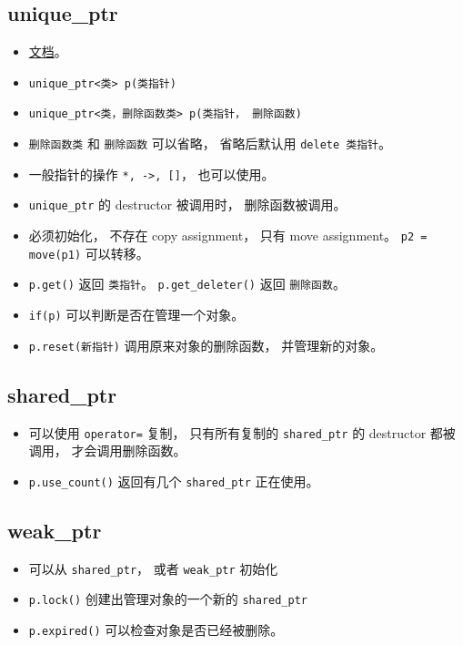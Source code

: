 
\begin{issues}
\issueDraft
\end{issues}

\subsection{unique\_ptr}
\begin{itemize}
\item \href{https://en.cppreference.com/w/cpp/memory/unique_ptr}{文档}。
\item \verb|unique_ptr<类> p(类指针)|
\item \verb|unique_ptr<类，删除函数类> p(类指针， 删除函数)|
\item \verb|删除函数类| 和 \verb|删除函数| 可以省略， 省略后默认用 \verb|delete 类指针|。
\item 一般指针的操作 \verb|*, ->, []|， 也可以使用。
\item \verb|unique_ptr| 的 destructor 被调用时， 删除函数被调用。
\item 必须初始化， 不存在 copy assignment， 只有 move assignment。 \verb|p2 = move(p1)| 可以转移。
\item \verb|p.get()| 返回 \verb|类指针|。 \verb|p.get_deleter()| 返回 \verb|删除函数|。
\item \verb|if(p)| 可以判断是否在管理一个对象。
\item \verb|p.reset(新指针)| 调用原来对象的删除函数， 并管理新的对象。
\end{itemize}

\subsection{shared\_ptr}
\begin{itemize}
\item 可以使用 \verb|operator=| 复制， 只有所有复制的 \verb|shared_ptr| 的 destructor 都被调用， 才会调用删除函数。
\item \verb|p.use_count()| 返回有几个 \verb|shared_ptr| 正在使用。
\end{itemize}

\subsection{weak\_ptr}
\begin{itemize}
\item 可以从 \verb|shared_ptr|， 或者 \verb|weak_ptr| 初始化
\item \verb|p.lock()| 创建出管理对象的一个新的 \verb|shared_ptr|
\item \verb|p.expired()| 可以检查对象是否已经被删除。
\end{itemize}
